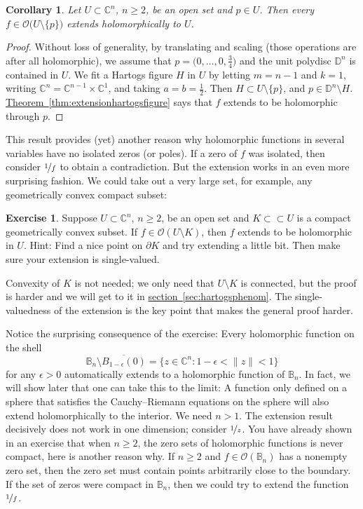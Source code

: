 \documentclass[12pt,openany]{book}
\newcommand{\snorm}[1]{\lVert {#1} \rVert}
\newcommand{\C}{{\mathbb{C}}}
\newcommand{\D}{{\mathbb{D}}}
\newcommand{\bB}{{\mathbb{B}}}
\newcommand{\sO}{{\mathscr{O}}}
\theoremstyle{plain}
\newtheorem{cor}[thm]{Corollary}
\theoremstyle{remark}
\theoremstyle{definition}
\newenvironment{exbox}{%
    \def\FrameCommand{\vrule width 1pt \relax\hspace{10pt}}%
    \MakeFramed{\advance\hsize-\width\FrameRestore}%
}{%
    \endMakeFramed
}
\theoremstyle{exercise}
\newtheorem{exercise}{Exercise}[section]
\theoremstyle{example}
\newcommand{\sectionref}[1]{\hyperref[#1]{section~\ref*{#1}}}
\newcommand{\thmref}[1]{\hyperref[#1]{Theorem~\ref*{#1}}}
\begin{document}
\begin{cor}
Let $U \subset \C^n$, $n \geq 2$, be an open set and $p \in U$.
Then every $f \in \sO\bigl(U \setminus \{ p \} \bigr)$
extends holomorphically to $U$.
\end{cor}

\begin{proof}
Without loss of generality,
by translating and scaling (those operations are after all holomorphic),
we assume that $p = \bigl(0,\ldots,0,\frac{3}{4}\bigr)$
and the unit polydisc $\D^n$ is contained in $U$.  We fit a Hartogs figure $H$
in $U$
by letting $m=n-1$ and $k=1$, writing $\C^n = \C^{n-1} \times \C^{1}$,
and taking $a = b = \frac{1}{2}$.
Then $H \subset U \setminus \{ p \}$, and $p \in \D^n \setminus H$.
\thmref{thm:extensionhartogsfigure} says that
$f$ extends to be holomorphic through $p$.
\end{proof}

This result provides (yet) another reason why holomorphic functions in several
variables have no isolated zeros (or poles).  If a zero of $f$ was isolated, then
consider $\nicefrac{1}{f}$ to obtain a contradiction.
But the extension works in an even more surprising fashion.  We could
take out a very large set, for example, any geometrically
convex compact subset:

\begin{exbox}
\begin{exercise} \label{exercise:convexhartogs}
Suppose $U \subset \C^n$, $n \geq 2$, be an open set and $K \subset \subset U$
is a compact geometrically
convex subset.
If $f \in \sO(U \setminus K)$,
then $f$ extends to be holomorphic in $U$.
Hint: Find a nice point on $\partial K$ and try extending a little bit.
Then make sure your extension is single-valued.
\end{exercise}
\end{exbox}

Convexity of $K$ is not needed; we only need that $U\setminus K$
is connected, but the proof is harder and we will get to it in
\sectionref{sec:hartogsphenom}.
The single-valuedness of the extension is the key point that makes the
general proof harder.

Notice the surprising consequence of the exercise:
Every holomorphic function on the shell
\begin{equation*}
\bB_n \setminus \overline{B_{1-\epsilon}(0)} =
\bigl\{ z \in \C^n : 1-\epsilon < \snorm{z} < 1 \bigr\}
\end{equation*}
for any $\epsilon > 0$ automatically
extends to a holomorphic function of $\bB_n$.
In fact, we will show later that one can take this to the limit:
A function only defined on a sphere that satisfies the Cauchy--Riemann
equations on the sphere will also extend holomorphically to the interior.
We need $n > 1$.
The extension result decisively does not work in one dimension; consider $\nicefrac{1}{z}$.
You have already shown in an exercise that when $n \geq 2$, the zero
sets of holomorphic functions is never compact, here is another reason why.
If $n \geq 2$ and $f \in \sO(\bB_n)$ has a nonempty zero set,
then the zero set must contain points arbitrarily close to the boundary.
If the set of zeros were compact in $\bB_n$, then we could try to
extend the function $\nicefrac{1}{f}$.
\end{document}
